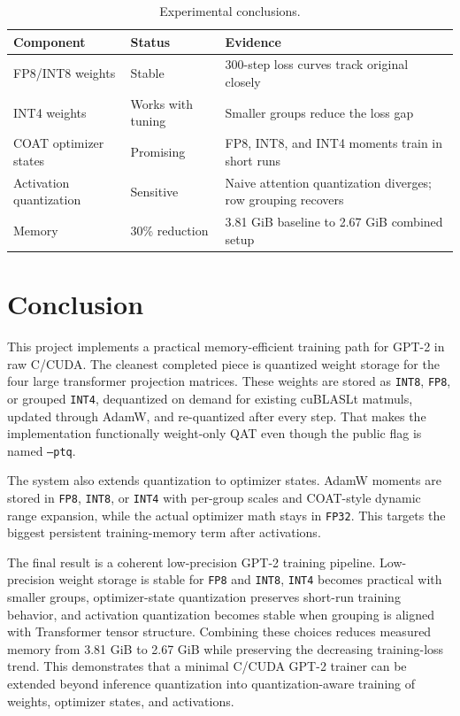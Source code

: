 \documentclass{article}
\begin{document}
\begin{table}[htbp]
  \centering
  \caption{Experimental conclusions.}
  \label{tab:summary}
  \begin{tabular}{lll}
    \toprule
    Component & Status & Evidence \\
    \midrule
    FP8/INT8 weights & Stable & 300-step loss curves track original closely \\
    INT4 weights & Works with tuning & Smaller groups reduce the loss gap \\
    COAT optimizer states & Promising & FP8, INT8, and INT4 moments train in short runs \\
    Activation quantization & Sensitive & Naive attention quantization diverges; row grouping recovers \\
    Memory & 30\% reduction & 3.81 GiB baseline to 2.67 GiB combined setup \\
    \bottomrule
  \end{tabular}
\end{table}

\section{Conclusion}

This project implements a practical memory-efficient training path for GPT-2 in raw
C/CUDA. The cleanest completed piece is quantized weight storage for the four large
transformer projection matrices. These weights are stored as \texttt{INT8}, \texttt{FP8},
or grouped \texttt{INT4}, dequantized on demand for existing cuBLASLt matmuls, updated
through AdamW, and re-quantized after every step. That makes the implementation
functionally weight-only QAT even though the public flag is named \texttt{--ptq}.

The system also extends quantization to optimizer states. AdamW moments are stored in
\texttt{FP8}, \texttt{INT8}, or \texttt{INT4} with per-group scales and COAT-style dynamic
range expansion, while the actual optimizer math stays in \texttt{FP32}. This targets the
biggest persistent training-memory term after activations.

The final result is a coherent low-precision GPT-2 training pipeline. Low-precision weight
storage is stable for \texttt{FP8} and \texttt{INT8}, \texttt{INT4} becomes practical with
smaller groups, optimizer-state quantization preserves short-run training behavior, and
activation quantization becomes stable when grouping is aligned with Transformer tensor
structure. Combining these choices reduces measured memory from 3.81 GiB to 2.67 GiB while
preserving the decreasing training-loss trend. This demonstrates that a minimal C/CUDA
GPT-2 trainer can be extended beyond inference quantization into quantization-aware
training of weights, optimizer states, and activations.
\end{document}
